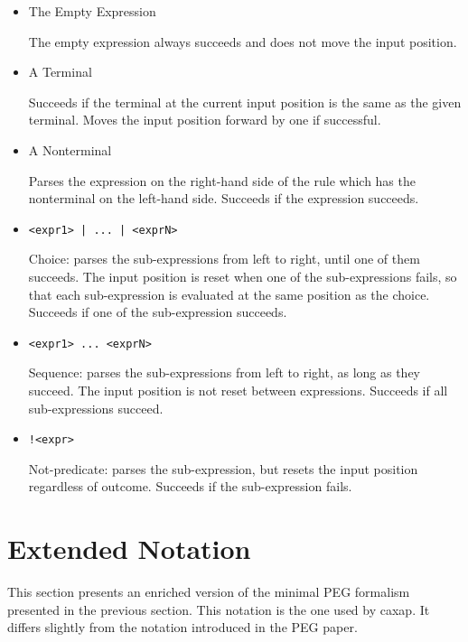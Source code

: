 \begin{itemize}
\item The Empty Expression

  The empty expression always succeeds and does not move the input position.

\item A Terminal

  Succeeds if the terminal at the current input position is the same as the
  given terminal. Moves the input position forward by one if successful.

\item A Nonterminal

  Parses the expression on the right-hand side of the rule which has the
  nonterminal on the left-hand side. Succeeds if the expression succeeds.

\item \lstinline{<expr1> | ... | <exprN>}

  Choice: parses the sub-expressions from left to right, until one of them
  succeeds. The input position is reset when one of the sub-expressions fails,
  so that each sub-expression is evaluated at the same position as the
  choice. Succeeds if one of the sub-expression succeeds.

\item \lstinline{<expr1> ... <exprN>}

  Sequence: parses the sub-expressions from left to right, as long as they
  succeed. The input position is not reset between expressions. Succeeds if all
  sub-expressions succeed.

\item \lstinline{!<expr>}

  Not-predicate: parses the sub-expression, but resets the input position
  regardless of outcome. Succeeds if the sub-expression fails.

\end{itemize}

\section{Extended Notation}
\label{extended_notation}

This section presents an enriched version of the minimal PEG formalism presented
in the previous section. This notation is the one used by caxap. It differs
slightly from the notation introduced in the PEG paper. \cite{ford2004}

